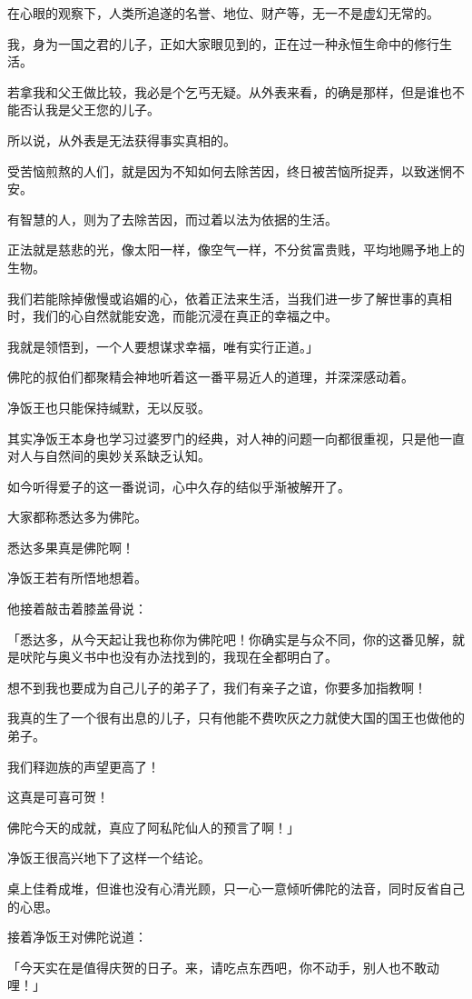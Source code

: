 \documentclass[twoside,openany]{book}
\begin{document}
在心眼的观察下，人类所追遂的名誉、地位、财产等，无一不是虚幻无常的。

我，身为一国之君的儿子，正如大家眼见到的，正在过一种永恒生命中的修行生活。

若拿我和父王做比较，我必是个乞丐无疑。从外表来看，的确是那样，但是谁也不能否认我是父王您的儿子。

所以说，从外表是无法获得事实真相的。

受苦恼煎熬的人们，就是因为不知如何去除苦因，终日被苦恼所捉弄，以致迷惘不安。

有智慧的人，则为了去除苦因，而过着以法为依据的生活。

正法就是慈悲的光，像太阳一样，像空气一样，不分贫富贵贱，平均地赐予地上的生物。

我们若能除掉傲慢或谄媚的心，依着正法来生活，当我们进一步了解世事的真相时，我们的心自然就能安逸，而能沉浸在真正的幸福之中。

我就是领悟到，一个人要想谋求幸福，唯有实行正道。」

佛陀的叔伯们都聚精会神地听着这一番平易近人的道理，并深深感动着。

净饭王也只能保持缄默，无以反驳。

其实净饭王本身也学习过婆罗门的经典，对人神的问题一向都很重视，只是他一直对人与自然间的奥妙关系缺乏认知。

如今听得爱子的这一番说词，心中久存的结似乎渐被解开了。

大家都称悉达多为佛陀。

悉达多果真是佛陀啊！

净饭王若有所悟地想着。

他接着敲击着膝盖骨说：

「悉达多，从今天起让我也称你为佛陀吧！你确实是与众不同，你的这番见解，就是吠陀与奥义书中也没有办法找到的，我现在全都明白了。

想不到我也要成为自己儿子的弟子了，我们有亲子之谊，你要多加指教啊！

我真的生了一个很有出息的儿子，只有他能不费吹灰之力就使大国的国王也做他的弟子。

我们释迦族的声望更高了！

这真是可喜可贺！

佛陀今天的成就，真应了阿私陀仙人的预言了啊！」

净饭王很高兴地下了这样一个结论。

桌上佳肴成堆，但谁也没有心清光顾，只一心一意倾听佛陀的法音，同时反省自己的心思。

接着净饭王对佛陀说道：

「今天实在是值得庆贺的日子。来，请吃点东西吧，你不动手，别人也不敢动哩！」
\end{document}
